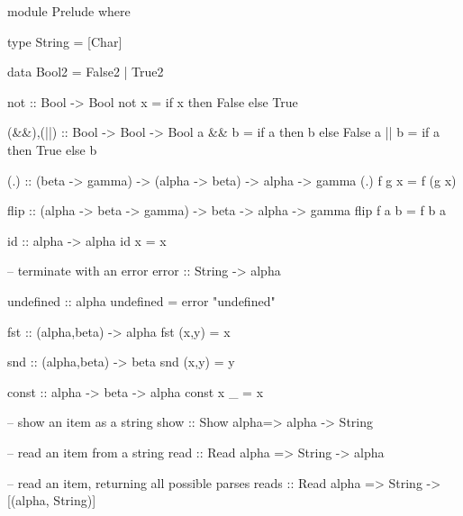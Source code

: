 \begin{code}
module Prelude where

type String = [Char]

data Bool2 = False2 | True2

not :: Bool -> Bool
not x = if x then False else True

(&&),(||) :: Bool -> Bool -> Bool
a && b = if a then b else False
a || b = if a then True else b

(.) :: (beta -> gamma) -> (alpha -> beta) -> alpha -> gamma
(.) f g x = f (g x)

flip :: (alpha -> beta -> gamma) -> beta -> alpha -> gamma
flip f a b = f b a

id :: alpha -> alpha
id x = x

-- terminate with an error
error :: String -> alpha
\end{code}\begin{code}
undefined :: alpha
undefined = error "undefined"

fst :: (alpha,beta) -> alpha
fst (x,y) = x

snd :: (alpha,beta) -> beta
snd (x,y) = y

const :: alpha -> beta -> alpha
const x _ =  x

-- show an item as a string
show :: Show alpha=> alpha -> String

-- read an item from a string
read :: Read alpha => String -> alpha

-- read an item, returning all possible parses
reads :: Read alpha => String -> [(alpha, String)]
\end{code}


